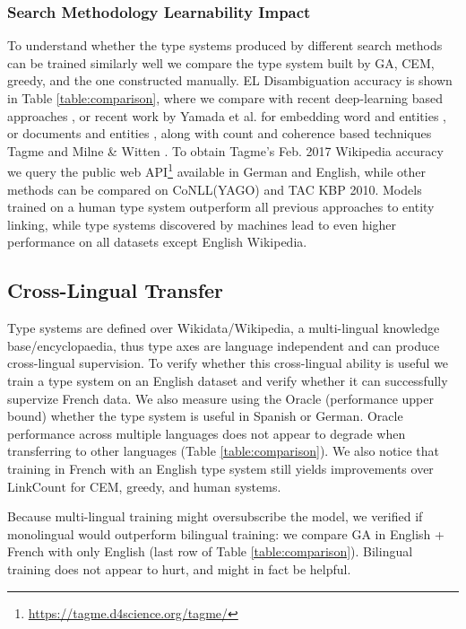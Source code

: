 \documentclass[letterpaper]{article}
\begin{document}
\subsubsection{Search Methodology Learnability Impact}
To understand whether the type systems produced by different search methods can be trained similarly well we compare the type system built by GA, CEM, greedy, and the one constructed manually. EL Disambiguation accuracy is shown in Table \ref{table:comparison}, where we compare with recent deep-learning based approaches \cite{globerson2016collective}, or recent work by Yamada et al. for embedding word and entities \cite{yamada2016joint}, or documents and entities \cite{yamada2017learning}, along with count and coherence based techniques Tagme \cite{tagme} and Milne \& Witten \cite{milne2008learning}. To obtain Tagme's Feb. 2017 Wikipedia accuracy we query the public web API\footnote{\url{https://tagme.d4science.org/tagme/}} available in German and English, while other methods can be compared on CoNLL(YAGO) and TAC KBP 2010. Models trained on a human type system outperform all previous approaches to entity linking, while type systems discovered by machines lead to even higher performance on all datasets except English Wikipedia.

\subsection{Cross-Lingual Transfer}
Type systems are defined over Wikidata/Wikipedia, a multi-lingual knowledge base/encyclopaedia, thus type axes are language independent and can produce cross-lingual supervision. To verify whether this cross-lingual ability is useful we train a type system on an English dataset and verify whether it can successfully supervize French data. We also measure using the Oracle (performance upper bound) whether the type system is useful in Spanish or German. Oracle performance across multiple languages does not appear to degrade when transferring to other languages (Table \ref{table:comparison}). We also notice that training in French with an English type system still yields improvements over $\mathrm{LinkCount}$ for CEM, greedy, and human systems.

Because multi-lingual training might oversubscribe the model, we verified if monolingual would outperform bilingual training: we compare GA in English + French with only English (last row of Table \ref{table:comparison}). Bilingual training does not appear to hurt, and might in fact be helpful.
\end{document}
